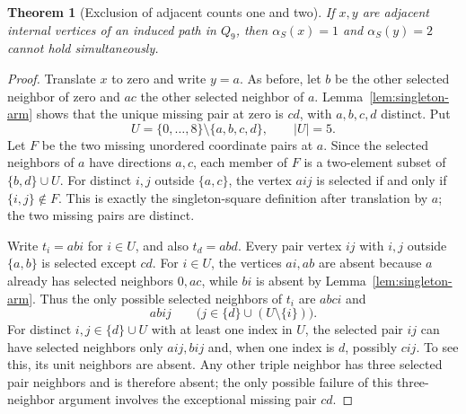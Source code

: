 \documentclass[11pt,a4paper]{article}
\newtheorem{theorem}{Theorem}[section]
\theoremstyle{definition}
\theoremstyle{remark}
\newcommand{\Q}{Q}
\begin{document}
\begin{theorem}[Exclusion of adjacent counts one and two]\label{thm:no-adjacent-one-two}
If $x,y$ are adjacent internal vertices of an induced path in $\Q_9$, then $\alpha_S(x)=1$ and $\alpha_S(y)=2$ cannot hold simultaneously.
\end{theorem}
\begin{proof}
Translate $x$ to zero and write $y=a$. As before, let $b$ be the other selected neighbor of zero and $ac$ the other selected neighbor of $a$. Lemma~\ref{lem:singleton-arm} shows that the unique missing pair at zero is $cd$, with $a,b,c,d$ distinct. Put
\[
U=\{0,\ldots,8\}\setminus\{a,b,c,d\},\qquad |U|=5.
\]
Let $F$ be the two missing unordered coordinate pairs at $a$. Since the selected neighbors of $a$ have directions $a,c$, each member of $F$ is a two-element subset of $\{b,d\}\cup U$. For distinct $i,j$ outside $\{a,c\}$, the vertex $aij$ is selected if and only if $\{i,j\}\notin F$. This is exactly the singleton-square definition after translation by $a$; the two missing pairs are distinct.

Write $t_i=abi$ for $i\in U$, and also $t_d=abd$. Every pair vertex $ij$ with $i,j$ outside $\{a,b\}$ is selected except $cd$. For $i\in U$, the vertices $ai,ab$ are absent because $a$ already has selected neighbors $0,ac$, while $bi$ is absent by Lemma~\ref{lem:singleton-arm}. Thus the only possible selected neighbors of $t_i$ are $abci$ and
\[
abij\qquad\bigl(j\in\{d\}\cup(U\setminus\{i\})\bigr).
\]
For distinct $i,j\in\{d\}\cup U$ with at least one index in $U$, the selected pair $ij$ can have selected neighbors only $aij,bij$ and, when one index is $d$, possibly $cij$. To see this, its unit neighbors are absent. Any other triple neighbor has three selected pair neighbors and is therefore absent; the only possible failure of this three-neighbor argument involves the exceptional missing pair $cd$.


\end{proof}
\end{document}

